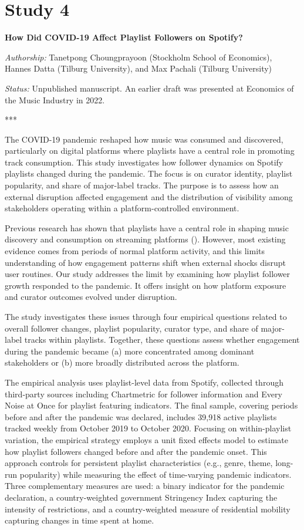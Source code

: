 \section{Study 4}
\textbf{How Did COVID-19 Affect Playlist Followers on Spotify?}

\noindent
\textit{Authorship:} Tanetpong Choungprayoon (Stockholm School of Economics), Hannes Datta (Tilburg University), and Max Pachali (Tilburg University)

\noindent
\textit{Status:} Unpublished manuscript. An earlier draft was presented at Economics of the Music Industry in 2022.

\noindent
***

The COVID-19 pandemic reshaped how music was consumed and discovered, particularly on digital platforms where playlists have a central role in promoting track consumption. This study investigates how follower dynamics on Spotify playlists changed during the pandemic. The focus is on curator identity, playlist popularity, and share of major-label tracks. The purpose is to assess how an external disruption affected engagement and the distribution of visibility among stakeholders operating within a platform-controlled environment.

Previous research has shown that playlists have a central role in shaping music discovery and consumption on streaming platforms (\cite{Aguiar2018-wt,Datta2018-xz}). However, most existing evidence comes from periods of normal platform activity, and this limits understanding of how engagement patterns shift when external shocks disrupt user routines. Our study addresses the limit by examining how playlist follower growth responded to the pandemic. It offers insight on how platform exposure and curator outcomes evolved under disruption.

The study investigates these issues through four empirical questions related to overall follower changes, playlist popularity, curator type, and share of major-label tracks within playlists. Together, these questions assess whether engagement during the pandemic became (a) more concentrated among dominant stakeholders or (b) more broadly distributed across the platform.

The empirical analysis uses playlist-level data from Spotify, collected through third-party sources including Chartmetric for follower information and Every Noise at Once for playlist featuring indicators. The final sample, covering periods before and after the pandemic was declared, includes 39,918 active playlists tracked weekly from October 2019 to October 2020. Focusing on within-playlist variation, the empirical strategy employs a unit fixed effects model to estimate how playlist followers changed before and after the pandemic onset. This approach controls for persistent playlist characteristics (e.g., genre, theme, long-run popularity) while measuring the effect of time-varying pandemic indicators. Three complementary measures are used: a binary indicator for the pandemic declaration, a country-weighted government Stringency Index capturing the intensity of restrictions, and a country-weighted measure of residential mobility capturing changes in time spent at home.

